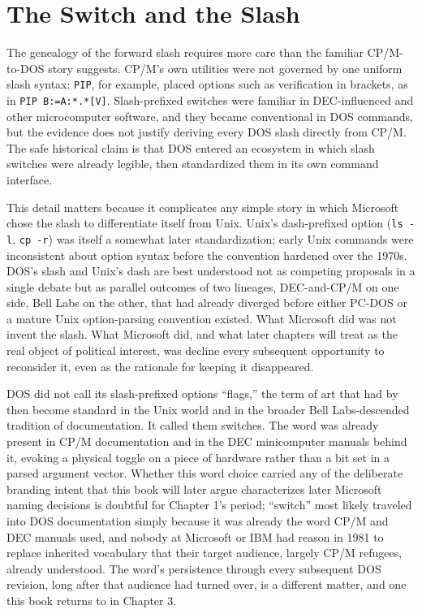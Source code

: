 \documentclass[11pt]{book}
\begin{document}
\section{The Switch and the Slash}

The genealogy of the forward slash requires more care than the familiar CP/M-to-DOS story suggests. CP/M's own utilities were not governed by one uniform slash syntax: \texttt{PIP}, for example, placed options such as verification in brackets, as in \texttt{PIP B:=A:*.*[V]}. Slash-prefixed switches were familiar in DEC-influenced and other microcomputer software, and they became conventional in DOS commands, but the evidence does not justify deriving every DOS slash directly from CP/M. The safe historical claim is that DOS entered an ecosystem in which slash switches were already legible, then standardized them in its own command interface.

This detail matters because it complicates any simple story in which Microsoft chose the slash to differentiate itself from Unix. Unix's dash-prefixed option (\texttt{ls -l}, \texttt{cp -r}) was itself a somewhat later standardization; early Unix commands were inconsistent about option syntax before the convention hardened over the 1970s. DOS's slash and Unix's dash are best understood not as competing proposals in a single debate but as parallel outcomes of two lineages, DEC-and-CP/M on one side, Bell Labs on the other, that had already diverged before either PC-DOS or a mature Unix option-parsing convention existed. What Microsoft did was not invent the slash. What Microsoft did, and what later chapters will treat as the real object of political interest, was decline every subsequent opportunity to reconsider it, even as the rationale for keeping it disappeared.

DOS did not call its slash-prefixed options ``flags,'' the term of art that had by then become standard in the Unix world and in the broader Bell Labs-descended tradition of documentation. It called them switches. The word was already present in CP/M documentation and in the DEC minicomputer manuals behind it, evoking a physical toggle on a piece of hardware rather than a bit set in a parsed argument vector. Whether this word choice carried any of the deliberate branding intent that this book will later argue characterizes later Microsoft naming decisions is doubtful for Chapter 1's period; ``switch'' most likely traveled into DOS documentation simply because it was already the word CP/M and DEC manuals used, and nobody at Microsoft or IBM had reason in 1981 to replace inherited vocabulary that their target audience, largely CP/M refugees, already understood. The word's persistence through every subsequent DOS revision, long after that audience had turned over, is a different matter, and one this book returns to in Chapter 3.
\end{document}
